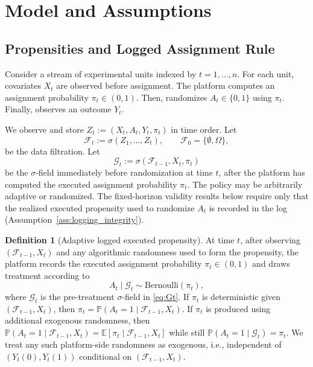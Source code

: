 \documentclass[11pt]{article}
\numberwithin{equation}{section}
\theoremstyle{plain}
\theoremstyle{definition}
\newtheorem{definition}[theorem]{Definition}
\theoremstyle{remark}
\newcommand{\E}{\mathbb{E}}
\newcommand{\Pp}{\mathbb{P}}
\newcommand{\cF}{\mathcal{F}}
\newcommand{\cG}{\mathcal{G}}
\begin{document}
\section{Model and Assumptions}\label{sec:model}

\subsection{Propensities and Logged Assignment Rule}\label{sec:propensities}

Consider a stream of experimental units indexed by $t=1,\dots,n$. For each unit, covariates $X_t$ are observed before assignment. The platform computes an assignment probability $\pi_t\in(0,1)$. Then, randomizes $A_t\in\{0,1\}$ using $\pi_t$. Finally, observes an outcome $Y_t$. 

We observe and store $Z_t:=(X_t,A_t,Y_t,\pi_t)$ in time order. Let
\begin{equation}\label{eq:Ft}
\cF_t := \sigma(Z_1,\dots,Z_t), \qquad \cF_0 = \{\emptyset,\Omega\},
\end{equation}
be the data filtration. Let
\begin{equation}\label{eq:Gt}
\cG_t := \sigma(\cF_{t-1},X_t,\pi_t)
\end{equation}
be the $\sigma$-field immediately before randomization at time $t$, after the platform has computed the executed assignment probability $\pi_t$. The policy may be arbitrarily adaptive or randomized. The fixed-horizon validity results below require only that the realized executed propensity used to randomize $A_t$ is recorded in the log (Assumption~\ref{ass:logging_integrity}).

\begin{definition}[Adaptive logged executed propensity]\label{def:propensity}
At time $t$, after observing $(\cF_{t-1},X_t)$ and any algorithmic randomness used to form the propensity, the platform records the executed assignment probability $\pi_t\in(0,1)$ and draws treatment according to
\[
A_t \mid \cG_t \sim \mathrm{Bernoulli}(\pi_t),
\]
where $\cG_t$ is the pre-treatment $\sigma$-field in \eqref{eq:Gt}. If $\pi_t$ is deterministic given $(\cF_{t-1},X_t)$, then $\pi_t=\Pp(A_t=1\mid \cF_{t-1},X_t)$. If $\pi_t$ is produced using additional exogenous randomness, then $\Pp(A_t=1\mid \cF_{t-1},X_t)=\E[\pi_t\mid \cF_{t-1},X_t]$ while still $\Pp(A_t=1\mid \cG_t)=\pi_t$. We treat any such platform-side randomness as exogenous, i.e., independent of $(Y_t(0),Y_t(1))$ conditional on $(\cF_{t-1},X_t)$.
\end{definition}
\end{document}
